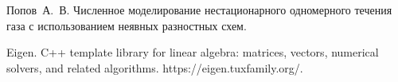 \begin{thebibliography}{2}

  Попов~А.~В.
  Численное моделирование нестационарного одномерного течения газа с использованием неявных разностных схем. 

  Eigen. C++ template library for linear algebra: matrices, vectors, numerical solvers,
and related algorithms. https://eigen.tuxfamily.org/.


\end{thebibliography}

